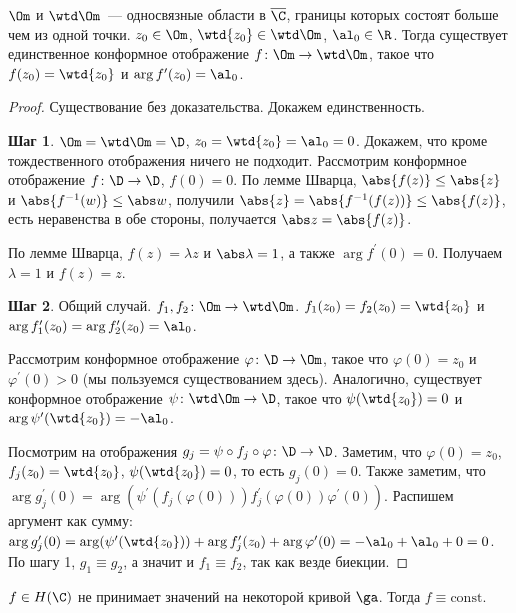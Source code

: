 \begin{theorem}
    $\Om$ и $\wtd\Om$~--- односвязные области в $\overline\C$, границы
    которых состоят больше чем из одной точки.
    $z_0 \in \Om$, $\wtd{z_0} \in \wtd\Om$, $\al_0 \in \R$.
    Тогда существует единственное конформное отображение
    $f \colon \Om \to \wtd\Om$, такое что $f(z_0) = \wtd{z_0}$
    и $\arg f^\prime(z_0) = \al_0$.
\end{theorem}

\begin{proof}
    Существование без доказательства. Докажем единственность.

    \textbf{Шаг 1}. $\Om = \wtd\Om = \D$, $z_0 = \wtd{z_0} = \al_0 = 0$.
    Докажем, что кроме тождественного отображения ничего не подходит.
    Рассмотрим конформное отображение $f\colon\D \to \D$, $f(0) = 0$.
    По лемме Шварца, $\abs{f(z)} \le \abs{z}$ и
    $\abs{f^{-1}(w)} \le \abs w$, получили
    $\abs{z} = \abs{f^{-1}(f(z))} \le \abs {f(z)}$, есть неравенства
    в обе стороны, получается $\abs z = \abs{f(z)}$.

    По лемме Шварца, $f(z) = \lambda z$ и $\abs\lambda = 1$, а также
    $\arg f^\prime(0) = 0$. Получаем $\lambda = 1$ и $f(z) = z$.

    \textbf{Шаг 2}. Общий случай.
    $f_1, f_2 \colon \Om \to \wtd\Om$.
    $f_1(z_0) = f_2(z_0) = \wtd{z_0}$ и $\arg f_1^\prime(z_0) = \arg f_2^\prime(z_0) = \al_0$.

    Рассмотрим конформное отображение $\varphi\colon \D \to \Om$, такое что
    $\varphi(0) = z_0$ и $\varphi^\prime(0) > 0$ (мы пользуемся существованием здесь).
    Аналогично, существует конформное отображение $\psi \colon \wtd\Om \to \D$,
    такое что $\psi(\wtd{z_0}) = 0$ и $\arg \psi^\prime(\wtd{z_0}) = -\al_0$.

    Посмотрим на отображения $g_j = \psi \circ f_j \circ \varphi \colon \D \to \D$.
    Заметим, что $\varphi(0) = z_0$, $f_j(z_0) = \wtd{z_0}$, $\psi(\wtd{z_0}) = 0$,
    то есть $g_j(0) = 0$. Также заметим, что $\arg g_j^\prime(0) = \arg(\psi^\prime(f_j(\varphi(0)))
        f_j^\prime(\varphi(0))\varphi^\prime(0))$. Распишем аргумент как сумму:
    $\arg g_j^\prime(0) = \arg(\psi^\prime(\wtd{z_0})) + \arg f_j^\prime(z_0) + \arg \varphi^\prime(0) =
        -\al_0 + \al_0 + 0 = 0$.
    По шагу 1, $g_1 \equiv g_2$, а значит и $f_1 \equiv f_2$, так как везде биекции.
\end{proof}

\begin{consequence}
    $f \in H(\C)$ не принимает значений на некоторой кривой $\ga$.
    Тогда $f \equiv \mathrm{const}$.
\end{consequence}

